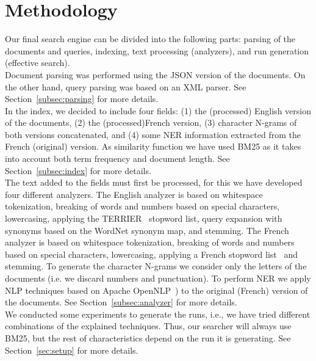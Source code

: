\section{Methodology}\label{sec:methodology}

Our final search engine can be divided into the following parts: parsing of the documents and queries, indexing,
text processing (analyzers), and run generation (effective search).\\

Document parsing was performed using the JSON version of the documents.
On the other hand, query parsing was based on an XML parser.
See Section~\ref{subsec:parsing} for more details.\\

In the index, we decided to include four fields: (1) the (processed) English version of the documents, (2) the
(processed)French version, (3) character N-grams of both versions concatenated, and (4) some NER information extracted
from the French (original) version.
As similarity function we have used BM25 as it takes into account both term frequency and document length.
See Section~\ref{subsec:index} for more details.\\

The text added to the fields must first be processed, for this we have developed four different analyzers.
The English analyzer is based on whitespace tokenization, breaking of words and numbers based on special characters,
lowercasing, applying the TERRIER~\cite{macdonald2006automatic} stopword list, query expansion with synonyms based on
the WordNet synonym map\cite{wordnet}, and stemming.
The French analyzer is based on whitespace tokenization, breaking of words and numbers based on special characters,
lowercasing, applying a French stopword list~\cite{stopword_french} and stemming.
To generate the character N-grams we consider only the letters of the documents (i.e. we discard numbers and punctuation).
To perform NER we apply NLP techniques based on Apache OpenNLP~\cite{ApacheOpenNLP}) to the original (French) version of
the documents.
See Section~\ref{subsec:analyzer} for more details.\\

We conducted some experiments to generate the runs, i.e., we have tried different combinations of the explained
techniques.
Thus, our searcher will always use BM25, but the rest of characteristics depend on the run it is generating.
See Section~\ref{sec:setup} for more details.